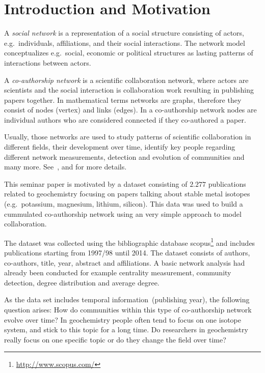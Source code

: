 \documentclass[runningheads,a4paper]{llncs}
\begin{document}
\section{Introduction and Motivation}
A \emph{social network} is a representation of a social structure consisting of actors, e.g.~individuals, affiliations, and their social interactions.
The network model conceptualizes e.g.~social, economic or political structures as lasting patterns of interactions between actors.~\cite{wasserman1994social}

A \emph{co-authorship network} is a scientific collaboration network, where actors are scientists and the social interaction is collaboration work resulting in publishing papers together.
In mathematical terms networks are graphs, therefore they consist of nodes (vertex) and links (edges).
In a co-authorship network nodes are individual authors who are considered connected if they co-authored a paper.~\cite{newman2001structure}

Usually, those networks are used to study patterns of scientific collaboration in different fields, their development over time, identify key people regarding different network measurements, detection and evolution of communities and many more. See~\cite{barabasi2002evolution}, \cite{newman2001structure} and \cite{newman2004coauthorship} for more details.

This seminar paper is motivated by a dataset consisting of $2.277$ publications related to geochemistry focusing on papers talking about stable metal isotopes (e.g.~potassium, magnesium, lithium, silicon). This data was used to build a cummulated co-authorship network using an very simple approach to model collaboration.

The dataset was collected using the bibliographic database scopus\footnote{\url{http://www.scopus.com/}} and includes publications starting from 1997/98 until 2014.
The dataset consists of authors, co-authors, title, year, abstract and affiliations.
A basic network analysis had already been conducted for example centrality measurement, community detection, degree distribution and average degree.

As the data set includes temporal information~(publishing year), the following question arises: How do communities within this type of co-authorship network evolve over time? In geochemistry people often tend to focus on one isotope system, and stick to this topic for a long time. Do researchers in geochemistry really focus on one specific topic or do they change the field over time?
\end{document}
